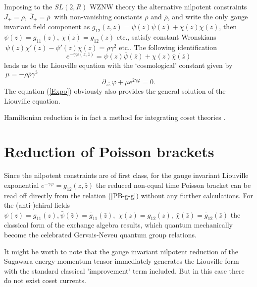 \documentclass[a4paper,12]{article}
\begin{document}
Imposing to the $SL(2,R)$ WZNW theory the alternative nilpotent
constraints $J_+=\rho,~\bar J_+=\bar\rho~$ with non-vanishing
constants $\rho$ and $\bar\rho$, and write the only gauge
invariant field component as $g_{12}(z, \bar z)=
\psi(z)\bar\psi(\bar z)+\chi(z)\bar\chi(\bar z)$,
then $\psi(z)=g_{11}(z),~ \chi(z)= g_{12}(z)$ etc.,
satisfy constant Wronskians 
$~\psi(z)\chi'(z)-\psi'(z)\chi(z)=\rho\gamma^2$ etc..
The following identification
\begin{equation}\label{Expo}
e^{-\gamma\varphi(z, \bar z)}=\psi(z)\bar\psi(\bar z)+\chi(z)\bar\chi(\bar z)
\end{equation}
leads us to the Liouville equation with the `cosmological' constant given by
$~\mu=-\rho\bar\rho\gamma^3~$
\begin{equation}\label{Lio}
\partial_{z\bar z}\, \varphi +\mu e^{2\gamma\varphi}=0.
\end{equation}
The equation (\ref{Expo}) obviously also provides the general 
solution of the Liouville equation. 

Hamiltonian reduction is
in fact a method for integrating coset theories \cite{FJW}.

\section{Reduction of Poisson brackets}

Since the nilpotent constraints are of first class, for the gauge
invariant Liouville exponential $e^{-\gamma\varphi}=g_{12}(z, \bar z)$
the reduced non-equal time Poisson bracket can be read off directly
from the relation (\ref{PB-g-g}) without any further calculations. For
the (anti-)chiral fields $\psi(z)=g_{11}(z),\bar\psi(\bar z)=\bar
g_{11}(\bar z),\,\,\chi(z)=g_{12}(z),\,\bar\chi(\bar z)=\bar g_{12}(\bar
z)$ the classical form of the exchange algebra results, which quantum
mechanically become the celebrated Gervais-Neveu quantum group
relations.

It might be worth to note that the gauge invariant 
nilpotent reduction of the Sugawara
energy-momentum tensor immediately generates the 
Liouville form with the standard classical 'improvement' term
included. But in this case there do not exist coset currents.
\end{document}
